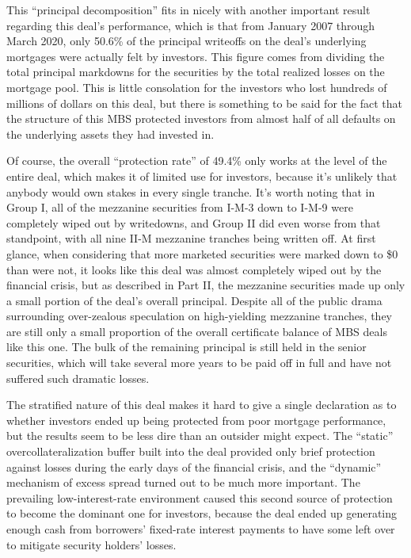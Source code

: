 \documentclass[12pt]{article}
\begin{document}
This “principal decomposition” fits in nicely with another important result regarding this deal’s performance, which is that from January 2007 through March 2020, only 50.6\% of the principal writeoffs on the deal’s underlying mortgages were actually felt by investors. This figure comes from dividing the total principal markdowns for the securities by the total realized losses on the mortgage pool. This is little consolation for the investors who lost hundreds of millions of dollars on this deal, but there is something to be said for the fact that the structure of this MBS protected investors from almost half of all defaults on the underlying assets they had invested in.
	
Of course, the overall “protection rate” of 49.4\% only works at the level of the entire deal, which makes it of limited use for investors, because it’s unlikely that anybody would own stakes in every single tranche. It’s worth noting that in Group I, all of the mezzanine securities from I-M-3 down to I-M-9 were completely wiped out by writedowns, and Group II did even worse from that standpoint, with all nine II-M mezzanine tranches being written off. At first glance, when considering that more marketed securities were marked down to \$0 than were not, it looks like this deal was almost completely wiped out by the financial crisis, but as described in Part II, the mezzanine securities made up only a small portion of the deal’s overall principal. Despite all of the public drama surrounding over-zealous speculation on high-yielding mezzanine tranches, they are still only a small proportion of the overall certificate balance of MBS deals like this one. The bulk of the remaining principal is still held in the senior securities, which will take several more years to be paid off in full and have not suffered such dramatic losses.

The stratified nature of this deal makes it hard to give a single declaration as to whether investors ended up being protected from poor mortgage performance, but the results seem to be less dire than an outsider might expect. The “static” overcollateralization buffer built into the deal provided only brief protection against losses during the early days of the financial crisis, and the “dynamic” mechanism of excess spread turned out to be much more important. The prevailing low-interest-rate environment caused this second source of protection to become the dominant one for investors, because the deal ended up generating enough cash from borrowers' fixed-rate interest payments to have some left over to mitigate security holders’ losses. 
\end{document}
